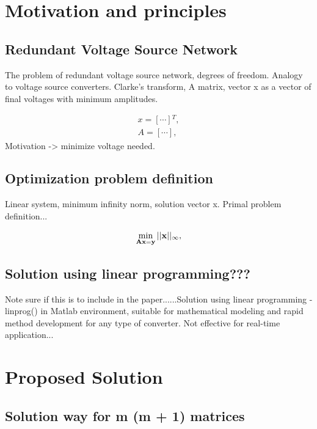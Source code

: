 \documentclass[journal]{IEEEtranTIE}
\begin{document}
\section{Motivation and principles}

\subsection{Redundant Voltage Source Network }

The problem of redundant voltage source network, degrees of freedom.
Analogy to voltage source converters. Clarke's transform, A matrix,
vector x as a vector of final voltages with minimum amplitudes.

\begin{equation}
\begin{aligned}x=\left[\cdots\right]{}^{T},\\
A=\left[\cdots\right],
\end{aligned}
\label{eq:eq2-1}
\end{equation}
Motivation -> minimize voltage needed.

\subsection{Optimization problem definition}

Linear system, minimum infinity norm, solution vector x. Primal problem
definition...

\begin{equation}
\min_{\mathbf{Ax}=\mathbf{y}}||\mathbf{x}||_{\text{\ensuremath{\infty}}},\label{eq:1}
\end{equation}


\subsection{Solution using linear programming???}

Note sure if this is to include in the paper......Solution using linear
programming - linprog() in Matlab environment, suitable for mathematical
modeling and rapid method development for any type of converter. Not
effective for real-time application...

\section{Proposed Solution}

\subsection{Solution way for m (m + 1) matrices}
\end{document}
